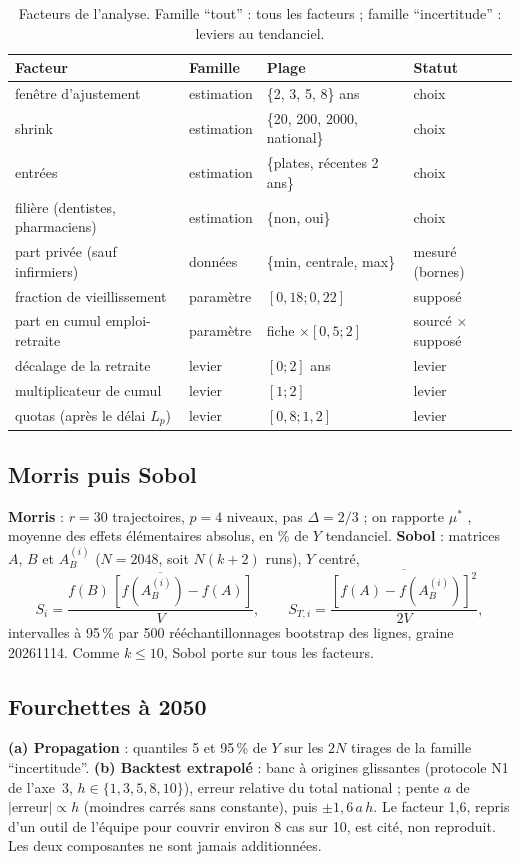 \documentclass[11pt]{article}
\begin{document}
\begin{table}[h]\centering\small
\begin{tabular}{llll}
\toprule
Facteur & Famille & Plage & Statut \\
\midrule
fenêtre d'ajustement & estimation & \{2, 3, 5, 8\} ans & choix \\
shrink & estimation & \{20, 200, 2000, national\} & choix \\
entrées & estimation & \{plates, récentes 2 ans\} & choix \\
filière (dentistes, pharmaciens) & estimation & \{non, oui\} & choix \\
part privée (sauf infirmiers) & données & \{min, centrale, max\} & mesuré (bornes) \\
fraction de vieillissement & paramètre & $[0{,}18 ; 0{,}22]$ & supposé \\
part en cumul emploi-retraite & paramètre & fiche $\times [0{,}5 ; 2]$ & sourcé $\times$ supposé \\
décalage de la retraite & levier & $[0 ; 2]$ ans & levier \\
multiplicateur de cumul & levier & $[1 ; 2]$ & levier \\
quotas (après le délai $L_p$) & levier & $[0{,}8 ; 1{,}2]$ & levier \\
\bottomrule
\end{tabular}
\caption{Facteurs de l'analyse. Famille \enquote{tout} : tous les facteurs ; famille \enquote{incertitude} : leviers au
tendanciel.}\label{tab:fac}
\end{table}

\subsection{Morris puis Sobol}
\textbf{Morris} : $r = 30$ trajectoires, $p = 4$ niveaux, pas $\Delta = 2/3$ ; on rapporte $\mu^*$ \citep{campolongo2007}, moyenne des
effets élémentaires absolus, en \% de $Y$ tendanciel. \textbf{Sobol} : matrices $A$, $B$ et $A_B^{(i)}$
($N = 2048$, soit $N(k+2)$ runs), $Y$ centré,
\[
  S_i = \frac{\overline{f(B)\,[f(A_B^{(i)}) - f(A)]}}{V}, \qquad
  S_{T,i} = \frac{\overline{[f(A) - f(A_B^{(i)})]^2}}{2V},
\]
intervalles à 95\,\% par 500 rééchantillonnages bootstrap des lignes, graine \num{20261114}. Comme $k \le 10$,
Sobol porte sur tous les facteurs.

\subsection{Fourchettes à 2050}
\textbf{(a) Propagation} : quantiles 5 et 95\,\% de $Y$ sur les $2N$ tirages de la famille \enquote{incertitude}.
\textbf{(b) Backtest extrapolé} : banc à origines glissantes (protocole N1 de l'axe~3, $h \in \{1,3,5,8,10\}$),
erreur relative du total national ; pente $a$ de $|\text{erreur}| \propto h$ (moindres carrés sans constante),
puis $\pm 1{,}6\,a\,h$. Le facteur 1,6, repris d'un outil de l'équipe pour couvrir environ 8 cas sur 10, est cité,
non reproduit. Les deux composantes ne sont jamais additionnées.
\end{document}
